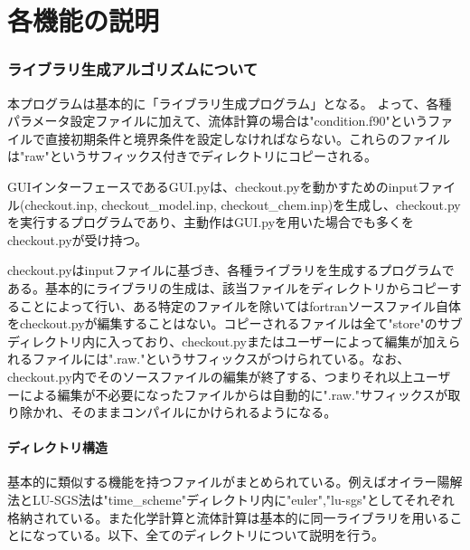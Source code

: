 \documentclass{jsarticle}
\begin{document}
%
%
%
%
%
\part{各機能の説明}
\section{ライブラリ生成アルゴリズムについて}%
本プログラムは基本的に「ライブラリ生成プログラム」となる。
よって、各種パラメータ設定ファイルに加えて、流体計算の場合は"condition.f90"というファイルで直接初期条件と境界条件を設定しなければならない。これらのファイルは"raw"というサフィックス付きでディレクトリにコピーされる。

GUIインターフェースであるGUI.pyは、checkout.pyを動かすためのinputファイル(checkout.inp, checkout\_model.inp, checkout\_chem.inp)を生成し、checkout.pyを実行するプログラムであり、主動作はGUI.pyを用いた場合でも多くをcheckout.pyが受け持つ。

checkout.pyはinputファイルに基づき、各種ライブラリを生成するプログラムである。基本的にライブラリの生成は、該当ファイルをディレクトリからコピーすることによって行い、ある特定のファイルを除いてはfortranソースファイル自体をcheckout.pyが編集することはない。コピーされるファイルは全て"store"のサブディレクトリ内に入っており、checkout.pyまたはユーザーによって編集が加えられるファイルには".raw."というサフィックスがつけられている。なお、checkout.py内でそのソースファイルの編集が終了する、つまりそれ以上ユーザーによる編集が不必要になったファイルからは自動的に".raw."サフィックスが取り除かれ、そのままコンパイルにかけられるようになる。
\subsection{ディレクトリ構造}
基本的に類似する機能を持つファイルがまとめられている。例えばオイラー陽解法とLU-SGS法は"time\_scheme"ディレクトリ内に"euler","lu-sgs"としてそれぞれ格納されている。また化学計算と流体計算は基本的に同一ライブラリを用いることになっている。以下、全てのディレクトリについて説明を行う。
\end{document}
